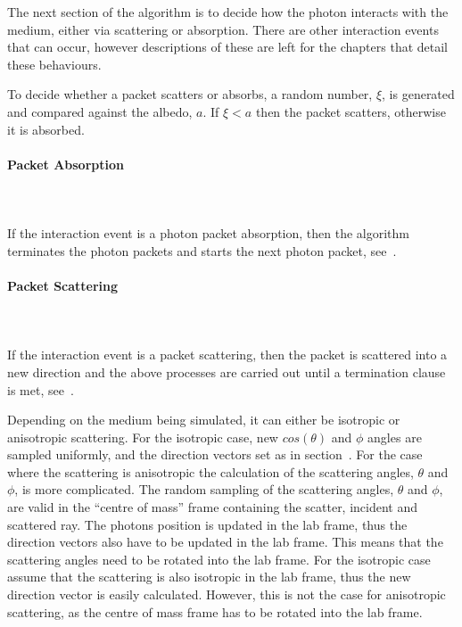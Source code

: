 The next section of the algorithm is to decide how the photon interacts with the medium, either via scattering or absorption. There are other interaction events that can occur, however descriptions of these are left for the chapters that detail these behaviours.
\medskip

To decide whether a packet scatters or absorbs, a random number, $\xi$, is generated and compared against the albedo, $a$. 
If $\xi < a$ then the packet scatters, otherwise it is absorbed. 

\paragraph{Packet Absorption}\hspace{0pt}\\
\\
If the interaction event is a photon packet absorption, then the algorithm terminates the photon packets and starts the next photon packet, see~.

\paragraph{Packet Scattering}\hspace{0pt}\\
\\
If the interaction event is a packet scattering, then the packet is scattered into a new direction and the above processes are carried out until a termination clause is met, see~.

Depending on the medium being simulated, it can either be isotropic or anisotropic scattering. 
For the isotropic case, new $cos\left(\theta\right)$ and $\phi$ angles are sampled uniformly, and the direction vectors set as in section~.
For the case where the scattering is anisotropic the calculation of the scattering angles, $\theta$ and $\phi$, is more complicated.
The random sampling of the scattering angles, $\theta$ and $\phi$, are valid in the ``centre of mass'' frame containing the scatter, incident and scattered ray.
The photons position is updated in the lab frame, thus the direction vectors also have to be updated in the lab frame.
This means that the scattering angles need to be rotated into the lab frame.
For the isotropic case assume that the scattering is also isotropic in the lab frame, thus the new direction vector is easily calculated.
However, this is not the case for anisotropic scattering, as the centre of mass frame has to be rotated into the lab frame.

